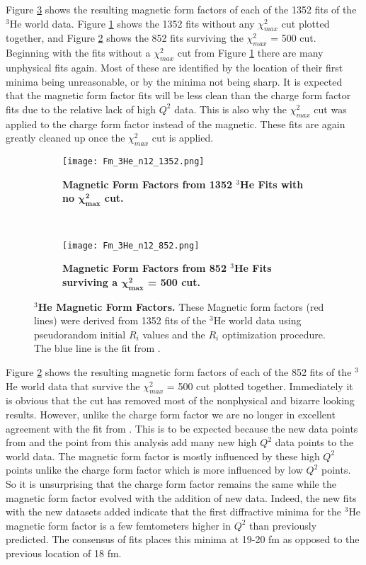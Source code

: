 Figure \ref{fig:3he_fm} shows the resulting magnetic form factors of each of the 1352 fits of the $^3$He world data. Figure \ref{fig:3he_fm_no_cut} shows the 1352 fits without any $\chi^2_{max}$ cut plotted together, and Figure \ref{fig:3he_fm_cut} shows the 852 fits surviving the $\chi^2_{max}$ = 500 cut. Beginning with the fits without a $\chi^2_{max}$ cut from Figure \ref{fig:3he_fm_no_cut} there are many unphysical fits again. Most of these are identified by the location of their first minima being unreasonable, or by the minima not being sharp. It is expected that the magnetic form factor fits will be less clean than the charge form factor fits due to the relative lack of high $Q^2$ data. This is also why the $\chi^2_{max}$ cut was applied to the charge form factor instead of the magnetic. These fits are again greatly cleaned up once the $\chi^2_{max}$ cut is applied.

\begin{figure}[!ht]
\begin{subfigure}{1.\textwidth}
  \centering
  \texttt{[image: Fm\_3He\_n12\_1352.png]}
  \caption{\bf{Magnetic Form Factors from 1352 $^3$He Fits with no $\boldsymbol{\chi^2_{max}}$ cut.}}
  \label{fig:3he_fm_no_cut}
\end{subfigure}\\
\begin{subfigure}{1.\textwidth}
  \centering
  \texttt{[image: Fm\_3He\_n12\_852.png]}
  \caption{\bf{Magnetic Form Factors from 852 $^3$He Fits surviving a $\boldsymbol{\chi^2_{max}}$ = 500 cut.}}
  \label{fig:3he_fm_cut}
\end{subfigure}
\caption[$^3$He Magnetic Form Factors] {
{\bf{$^3$He Magnetic Form Factors.}} These Magnetic form factors (red lines) were derived from 1352 fits of the $^3$He world data using pseudorandom initial $R_i$ values and the $R_i$ optimization procedure. The blue line is the fit from \cite{Article:Amroun}.}
\label{fig:3he_fm}
\end{figure}

Figure \ref{fig:3he_fm_cut} shows the resulting magnetic form factors of each of the 852 fits of the $^3$He world data that survive the $\chi^2_{max}$ = 500 cut plotted together. Immediately it is obvious that the cut has removed most of the nonphysical and bizarre looking results. However, unlike the charge form factor we are no longer in excellent agreement with the fit from \cite{Article:Amroun}. This is to be expected because the new data points from \cite{Article:Alex} and the point from this analysis add many new high $Q^2$ data points to the world data. The magnetic form factor is mostly influenced by these high $Q^2$ points unlike the charge form factor which is more influenced by low $Q^2$ points. So it is unsurprising that the charge form factor remains the same while the magnetic form factor evolved with the addition of new data. Indeed, the new fits with the new datasets added indicate that the first diffractive minima for the $^3$He magnetic form factor is a few femtometers higher in $Q^2$ than previously predicted. The consensus of fits places this minima at 19-20 fm as opposed to the previous location of 18 fm.  

